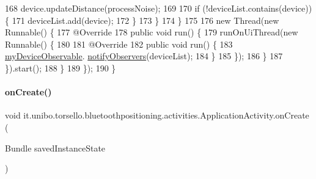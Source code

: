 \begin{DoxyCode}
168                         device.updateDistance(processNoise);
169 
170                         \textcolor{keywordflow}{if} (!deviceList.contains(device)) \{
171                             deviceList.add(device);
172                         \}
173                     \}
174                 \}
175 
176                 \textcolor{keyword}{new} Thread(\textcolor{keyword}{new} Runnable() \{
177                     @Override
178                     \textcolor{keyword}{public} \textcolor{keywordtype}{void} run() \{
179                         runOnUiThread(\textcolor{keyword}{new} Runnable() \{
180 
181                             @Override
182                             \textcolor{keyword}{public} \textcolor{keywordtype}{void} run() \{
183                                 \hyperlink{classit_1_1unibo_1_1torsello_1_1bluetoothpositioning_1_1activities_1_1ApplicationActivity_aa6481e11e062d3539e6848f0790852b8_aa6481e11e062d3539e6848f0790852b8}{myDeviceObservable}.
      \hyperlink{classit_1_1unibo_1_1torsello_1_1bluetoothpositioning_1_1observables_1_1DeviceObservable_aaf183e537e44cbd114c8eb76432da191_aaf183e537e44cbd114c8eb76432da191}{notifyObservers}(deviceList);
184                             \}
185                         \});
186                     \}
187                 \}).start();
188             \}
189         \});
190     \}
\end{DoxyCode}
\hypertarget{classit_1_1unibo_1_1torsello_1_1bluetoothpositioning_1_1activities_1_1ApplicationActivity_a395bfa7ec016998b254b9e197ef8d754_a395bfa7ec016998b254b9e197ef8d754}{}\label{classit_1_1unibo_1_1torsello_1_1bluetoothpositioning_1_1activities_1_1ApplicationActivity_a395bfa7ec016998b254b9e197ef8d754_a395bfa7ec016998b254b9e197ef8d754} 
\paragraph{\texorpdfstring{on\+Create()}{onCreate()}}
{\footnotesize\ttfamily void it.\+unibo.\+torsello.\+bluetoothpositioning.\+activities.\+Application\+Activity.\+on\+Create (\begin{DoxyParamCaption}\item[{Bundle}]{saved\+Instance\+State }\end{DoxyParamCaption})}


